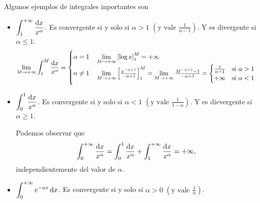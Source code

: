 \begin{example}
    Algunos ejemplos de integrales inportantes son
    \begin{itemize}
        \item $\displaystyle \int^{+\infty}_1 \frac{\dif x}{x^\alpha}$. Es
            convergente si y solo si $\alpha > 1$ $\left(\text{y vale }
            \frac{1}{\alpha-1}\right)$. Y es divergente si $\alpha \leq 1$.
            \[
                \lim_{M \to +\infty} \int^M_1 \frac{\dif x}{x^\alpha} =
                \begin{cases}
                    \alpha = 1 \quad \lim\limits_{M \to +\infty}
                    \left[\log x \right]^M_1 = + \infty \\
                    \alpha \neq 1 \quad \lim\limits_{M \to +\infty}
                    \left[\frac{x^{-\alpha+1}}{-\alpha+1}
                    \right]^M_1 = \lim\limits_{M \to +\infty}
                    \frac{M^{-\alpha+1}-1}{-\alpha+1}=\begin{cases}
                        \frac{1}{\alpha-1} \quad
                        \text{si $\alpha > 1$} \\
                        +\infty \quad \text{si $\alpha < 1$}
                    \end{cases}
                \end{cases}
            \]
        \item $\displaystyle \int^1_0 \frac{\dif x}{x^\alpha}$. Es convergente
            si y solo si $\alpha < 1$ $\left(\text{y vale } \frac{1}{1-\alpha
            }\right)$. Y es dievergente si $\alpha \geq 1$.

            Podemos observar que
            \[
                \int^{+\infty}_0 \frac{\dif x}{x^\alpha} = \int^1_0
                \frac{\dif x}{x^\alpha} + \int^{+\infty}_1
                \frac{\dif x}{x^\alpha} = +\infty,
            \]
            independientemente del valor de $\alpha$.
        \item $\displaystyle  \int^{+\infty}_0 e^{-ax} \dif x$. Es convergente
            si y solo si $\alpha > 0$ $\left(\text{y vale }\frac{1}{\alpha}\right)$.
    \end{itemize}
\end{example}

